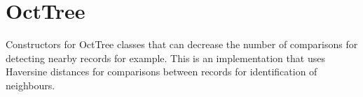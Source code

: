 \documentclass[letterpaper,10pt,english]{sphinxmanual}
\begin{document}
\begin{fulllineitems}
\begin{fulllineitems}
\begin{quote}
\begin{description}
\end{description}\end{quote}

\end{fulllineitems}


\end{fulllineitems}


\section{OctTree}
\label{\detokenize{users_guide:octtree}}\label{\detokenize{users_guide:module-GeoSpatialTools.octtree}}
\sphinxAtStartPar
Constructors for OctTree classes that can decrease the number of comparisons
for detecting nearby records for example. This is an implementation that uses
Haversine distances for comparisons between records for identification of
neighbours.
\end{document}
